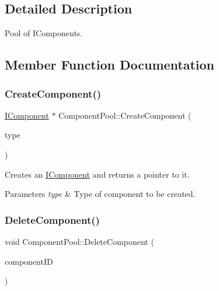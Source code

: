 \subsection{Detailed Description}
Pool of I\+Components. 

\subsection{Member Function Documentation}
\mbox{\label{class_component_pool_a08fcae7465ae05cae03872bcaa30203d}} 
\subsubsection{\texorpdfstring{Create\+Component()}{CreateComponent()}}
{\footnotesize\ttfamily \mbox{\hyperlink{class_i_component}{I\+Component}} $\ast$ Component\+Pool\+::\+Create\+Component (\begin{DoxyParamCaption}\item[{const \mbox{\hyperlink{class_component_pool_a7a88ce8bc60d1936539c2b9757b7e9ff}{Type}} \&}]{type }\end{DoxyParamCaption})}



Creates an \mbox{\hyperlink{class_i_component}{I\+Component}} and returns a pointer to it. 


\begin{DoxyParams}{Parameters}
{\em type} & Type of component to be created. \\
\hline
\end{DoxyParams}
\mbox{\label{class_component_pool_a5ffc15d4dabb968b528c349aea7b0357}} 
\subsubsection{\texorpdfstring{Delete\+Component()}{DeleteComponent()}}
{\footnotesize\ttfamily void Component\+Pool\+::\+Delete\+Component (\begin{DoxyParamCaption}\item[{unsigned int}]{component\+ID }\end{DoxyParamCaption})}



